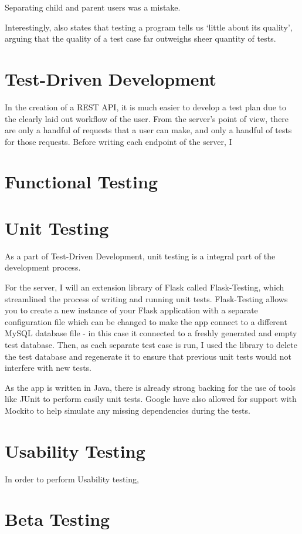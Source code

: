 Separating child and parent users was a mistake.

Interestingly, \cite{4597151} also states that testing a program tells us `little about its quality', arguing that the quality of a test case far outweighs sheer quantity of tests.

\section{Test-Driven Development}
In the creation of a REST API, it is much easier to develop a test plan due to the clearly laid out workflow of the user. From the server's point of view, there are only a handful of requests that a user can make, and only a handful of tests for those requests. Before writing each endpoint of the server, I 

\section{Functional Testing}

\section{Unit Testing}

As a part of Test-Driven Development, unit testing is a integral part of the development process.


For the server, I will an extension library of Flask called Flask-Testing, which streamlined the process of writing and running unit tests.
Flask-Testing allows you to create a new instance of your Flask application with a separate configuration file which can be changed to make the app connect to a different MySQL database file - in this case it connected to a freshly generated and empty test database.
Then, as each separate test case is run, I used the library to delete the test database and regenerate it to ensure that previous unit tests would not interfere with new tests.




As the app is written in Java, there is already strong backing for the use of tools like JUnit to perform easily unit tests.
Google have also allowed for support with Mockito to help simulate any missing dependencies during the tests.


\section{Usability Testing}
In order to perform Usability testing, 

\section{Beta Testing}